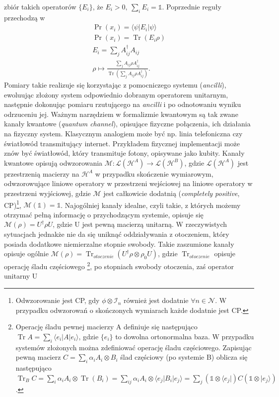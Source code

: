 \documentclass[10pt]{article} %
\DeclareMathOperator{\Trs}{Tr}
\newcommand{\Hx}[1]{\mathcal{H}^{#1}}
\newcommand{\Tr}[1]{\Trs(#1)}
\newcommand{\Pro}[1]{\Pr(#1)}
\newcommand{\Ket}[1]{|#1\rangle}
\newcommand{\Bra}[1]{\langle#1|}
\newcommand{\I}{\mathbb{1}}
\begin{document}
zbiór takich operatorów $\{E_i\}$, że $E_i > 0,~\sum_i E_i = \mathbb{1}$. Poprzednie reguły przechodzą w
\begin{gather}
\Pro{x_i} = \Bra{\psi} E_i \Ket{\psi}\\
\Pro{x_i} = \Tr{E_i \rho} \\
E_i = \sum_j  A^\dag_{ij}A_{ij} \\ 
\rho \mapsto \frac{\sum_j A_{ij} \rho A^\dag_{ij}}{\Tr{\sum_j A_{ij} \rho A^\dag_{ij}}}.
\end{gather} Pomiary takie realizuje się korzystając z pomocniczego systemu (\textit{ancilli}), ewoluując złożony system odpowiednio dobranym operatorem unitarnym, następnie dokonując pomiaru rzutującego na \textit{ancilli} i po odnotowaniu wyniku odrzuceniu jej.
Ważnym narzędziem w formalizmie kwantowym są tak zwane kanały kwantowe (\textit{quantum channel}), opisujące fizyczne połączenia, ich działania na fizyczny system. Klasycznym analogiem może być np. linia telefoniczna czy światłowód transmitujący internet. 
Przykładem fizycznej implementacji może znów być światłowód, który transmituje fotony, opisywane jako kubity. 
Kanały kwantowe opisują odwzorowania $\mathcal{M}: \mathcal{L}(\Hx{A}) \to \mathcal{L}({\Hx{B}})$, gdzie $\mathcal{L}({\Hx{A}})$ jest przestrzenią macierzy na $\Hx{A}$ w przypadku skończenie wymiarowym, odwzorowujące liniowe operatory w przestrzeni wejściowej na liniowe operatory w przestrzeni wyjściowej, gdzie $\mathcal{M}$ jest całkowicie dodatnią (\textit{completely positive}, CP)\footnote
{
Odwzorowanie jest CP, gdy $\phi \otimes \mathcal{I}_n$ również jest dodatnie $\forall n \in \mathcal{N}$. W przypadku odwzorowań o skończonych wymiarach każde dodatnie jest CP.
}, $\mathcal{M}(\mathbb{1}) = \mathbb{1}$. Najogólniej kanały idealne, czyli takie, z których możemy otrzymać pełną informację o przychodzącym systemie, opisuje się $\mathcal{M}(\rho) = U^\dag \rho U$, gdzie U jest pewną macierzą unitarną. W rzeczywistych sytuacjach jednakże nie da się uniknąć
oddziaływania z otoczeniem, który posiada dodatkowe niemierzalne stopnie swobody. Takie zaszumione kanały opisuje ogólnie $\mathcal{M}(\rho) = \Trs_{otoczenie}(U^\dag \rho \otimes \rho_0 U)$, gdzie $\Trs_{otoczenie}$ opisuje operację śladu częściowego
\footnote{
Operację śladu pewnej macierzy A definiuje się następująco $\Trs A = \sum_i \Bra{e_i} A \Ket{e_i}$, gdzie $\{e_i\}$ to dowolna ortonormalna baza.
W przypadku systemów złożonych można zdefiniować operację śladu częściowego. Zapisując pewną macierz $C = \sum_i \alpha_i A_i \otimes B_i$ ślad częściowy (po systemie B) oblicza się następująco $\Trs_B C = \sum_i \alpha_i A_i \otimes \Trs(B_i) = \sum_{ij} \alpha_i A_i \otimes \Bra{e_j}B_i\Ket{e_j} = \sum_j (\I \otimes \Bra{e_j}) C (\I \otimes \Ket{e_j})$.
}, po stopniach swobody otoczenia, zaś operator unitarny U
\end{document}
